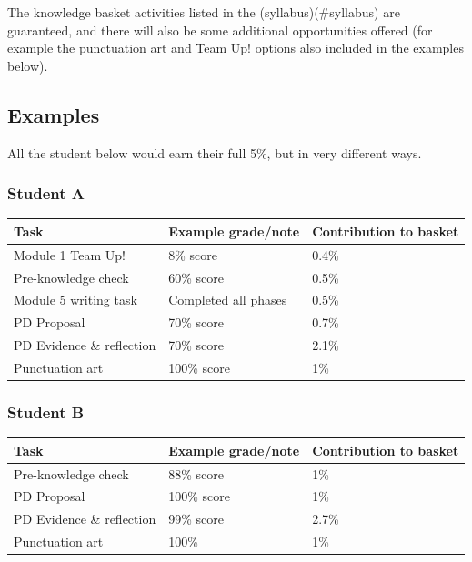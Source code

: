 \documentclass[
  openany]{book}
\begin{document}
The knowledge basket activities listed in the (syllabus)(\#syllabus) are guaranteed, and there will also be some additional opportunities offered (for example the punctuation art and Team Up! options also included in the examples below).

\hypertarget{examples}{%
\subsection{Examples}\label{examples}}

All the student below would earn their full 5\%, but in very different ways.

\hypertarget{student-a}{%
\subsubsection{Student A}\label{student-a}}

\begin{longtable}[]{@{}lll@{}}
\toprule
Task & Example grade/note & Contribution to basket \\
\midrule
\endhead
Module 1 Team Up! & 8\% score & 0.4\% \\
Pre-knowledge check & 60\% score & 0.5\% \\
Module 5 writing task & Completed all phases & 0.5\% \\
PD Proposal & 70\% score & 0.7\% \\
PD Evidence \& reflection & 70\% score & 2.1\% \\
Punctuation art & 100\% score & 1\% \\
\bottomrule
\end{longtable}

\hypertarget{student-b}{%
\subsubsection{Student B}\label{student-b}}

\begin{longtable}[]{@{}lll@{}}
\toprule
Task & Example grade/note & Contribution to basket \\
\midrule
\endhead
Pre-knowledge check & 88\% score & 1\% \\
PD Proposal & 100\% score & 1\% \\
PD Evidence \& reflection & 99\% score & 2.7\% \\
Punctuation art & 100\% & 1\% \\
\bottomrule
\end{longtable}
\end{document}
